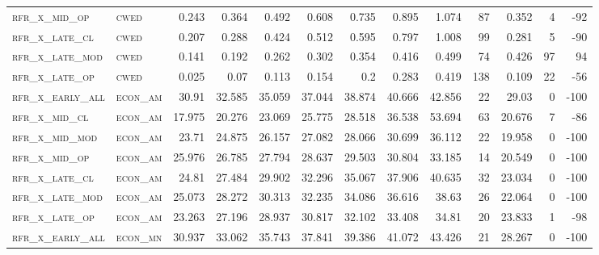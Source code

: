 \begin{landscape}
\begin{center}
\begin{footnotesize}
\begin{longtable}{llrrrrrrrr|rrr}
\textsc{rfr\_x\_mid\_op   } & \textsc{cwed      }   & 0.243   & 0.364   & 0.492   & 0.608    & 0.735    & 0.895    & 1.074    & 87     & 0.352         & 4             & -92             \\
\textsc{rfr\_x\_late\_cl  } & \textsc{cwed      }   & 0.207   & 0.288   & 0.424   & 0.512    & 0.595    & 0.797    & 1.008    & 99     & 0.281         & 5             & -90             \\
\textsc{rfr\_x\_late\_mod } & \textsc{cwed      }   & 0.141   & 0.192   & 0.262   & 0.302    & 0.354    & 0.416    & 0.499    & 74     & 0.426         & 97            & 94              \\
\textsc{rfr\_x\_late\_op  } & \textsc{cwed      }   & 0.025   & 0.07    & 0.113   & 0.154    & 0.2      & 0.283    & 0.419    & 138    & 0.109         & 22            & -56             \\
\textsc{rfr\_x\_early\_all} & \textsc{econ\_am  }   & 30.91   & 32.585  & 35.059  & 37.044   & 38.874   & 40.666   & 42.856   & 22     & 29.03         & 0             & -100            \\
\textsc{rfr\_x\_mid\_cl   } & \textsc{econ\_am  }   & 17.975  & 20.276  & 23.069  & 25.775   & 28.518   & 36.538   & 53.694   & 63     & 20.676        & 7             & -86             \\
\textsc{rfr\_x\_mid\_mod  } & \textsc{econ\_am  }   & 23.71   & 24.875  & 26.157  & 27.082   & 28.066   & 30.699   & 36.112   & 22     & 19.958        & 0             & -100            \\
\textsc{rfr\_x\_mid\_op   } & \textsc{econ\_am  }   & 25.976  & 26.785  & 27.794  & 28.637   & 29.503   & 30.804   & 33.185   & 14     & 20.549        & 0             & -100            \\
\textsc{rfr\_x\_late\_cl  } & \textsc{econ\_am  }   & 24.81   & 27.484  & 29.902  & 32.296   & 35.067   & 37.906   & 40.635   & 32     & 23.034        & 0             & -100            \\
\textsc{rfr\_x\_late\_mod } & \textsc{econ\_am  }   & 25.073  & 28.272  & 30.313  & 32.235   & 34.086   & 36.616   & 38.63    & 26     & 22.064        & 0             & -100            \\
\textsc{rfr\_x\_late\_op  } & \textsc{econ\_am  }   & 23.263  & 27.196  & 28.937  & 30.817   & 32.102   & 33.408   & 34.81    & 20     & 23.833        & 1             & -98             \\
\textsc{rfr\_x\_early\_all} & \textsc{econ\_mn  }   & 30.937  & 33.062  & 35.743  & 37.841   & 39.386   & 41.072   & 43.426   & 21     & 28.267        & 0             & -100            \\

\end{longtable}
\end{footnotesize}
\end{center}
\end{landscape}
